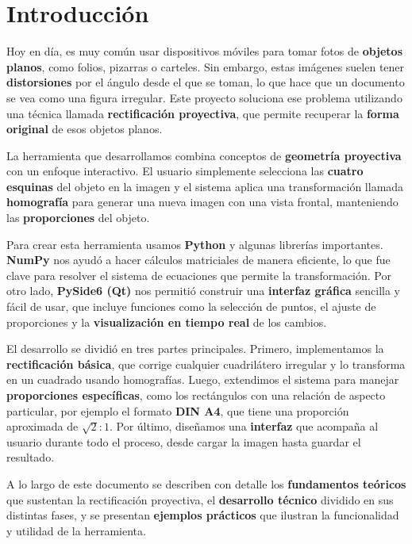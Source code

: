 
\chapter{Introducción}
\label{ch:introduccion}
Hoy en día, es muy común usar dispositivos móviles para tomar fotos de \textbf{objetos planos}, como folios, pizarras o carteles. Sin embargo, estas imágenes suelen tener \textbf{distorsiones} por el ángulo desde el que se toman, lo que hace que un documento se vea como una figura irregular. Este proyecto soluciona ese problema utilizando una técnica llamada \textbf{rectificación proyectiva}, que permite recuperar la \textbf{forma original} de esos objetos planos.

La herramienta que desarrollamos combina conceptos de \textbf{geometría proyectiva} con un enfoque interactivo. El usuario simplemente selecciona las \textbf{cuatro esquinas} del objeto en la imagen y el sistema aplica una transformación llamada \textbf{homografía} para generar una nueva imagen con una vista frontal, manteniendo las \textbf{proporciones} del objeto. 

Para crear esta herramienta usamos \textbf{Python} y algunas librerías importantes. \textbf{NumPy} nos ayudó a hacer cálculos matriciales de manera eficiente, lo que fue clave para resolver el sistema de ecuaciones que permite la transformación. Por otro lado, \textbf{PySide6 (Qt)} nos permitió construir una \textbf{interfaz gráfica} sencilla y fácil de usar, que incluye funciones como la selección de puntos, el ajuste de proporciones y la \textbf{visualización en tiempo real} de los cambios.

El desarrollo se dividió en tres partes principales. Primero, implementamos la \textbf{rectificación básica}, que corrige cualquier cuadrilátero irregular y lo transforma en un cuadrado usando homografías. Luego, extendimos el sistema para manejar \textbf{proporciones específicas}, como los rectángulos con una relación de aspecto particular, por ejemplo el formato \textbf{DIN A4}, que tiene una proporción aproximada de \(\sqrt{2}:1\). Por último, diseñamos una \textbf{interfaz} que acompaña al usuario durante todo el proceso, desde cargar la imagen hasta guardar el resultado.

A lo largo de este documento se describen con detalle los \textbf{fundamentos teóricos} que sustentan la rectificación proyectiva, el \textbf{desarrollo técnico} dividido en sus distintas fases, y se presentan \textbf{ejemplos prácticos} que ilustran la funcionalidad y utilidad de la herramienta.

